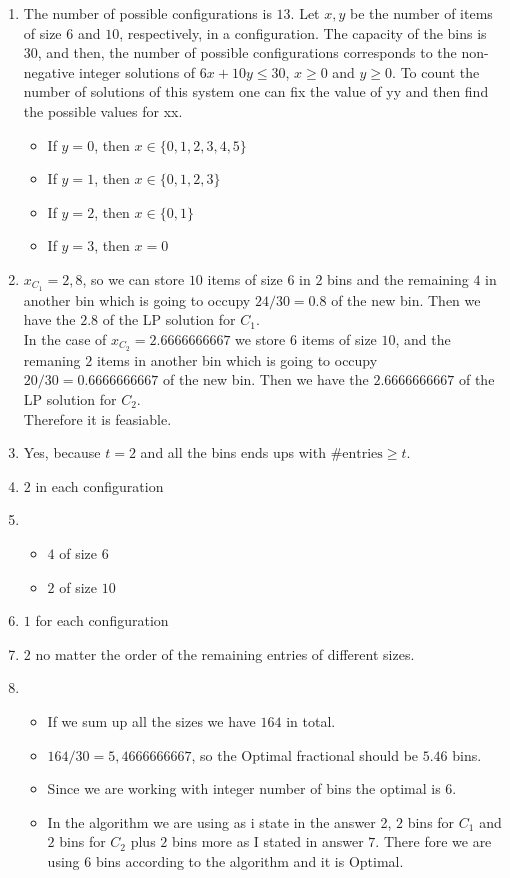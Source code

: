 \documentclass[12pt, a4paper]{article}
\begin{document}
\begin{enumerate}
  \item The number of possible configurations is $13$. Let $x,y$ be the number of items of size $6$ and $10$, respectively, in a configuration. The capacity of the bins is $30$, and then, the number of possible configurations corresponds to the non-negative integer solutions of $6x+10y \leq 30$, $x \geq 0$ and $y \geq 0$. To count the number of solutions of this system one can fix the value of yy and then find the possible values for xx.

  \begin{itemize}
    \item If $y=0$, then $x \in \{0,1,2,3,4,5\}$
    \item If $y=1$, then $x \in \{0,1,2,3\}$
    \item If $y=2$, then $x \in \{0,1\}$
    \item If $y=3$, then $x = 0$
  \end{itemize}

  \item $x_{C_1} = 2,8$, so we can store $10$ items of size $6$ in $2$ bins and the remaining $4$ in another bin which is going to occupy $24/30 = 0.8$ of the new bin. Then we have the $2.8$ of the LP solution for $C_1$.\\
  In the case of $x_{C_2} = 2.6666666667$ we store $6$ items of size $10$, and the remaning $2$ items in another bin which is going to occupy $20/30 = 0.6666666667$ of the new bin. Then we have the $2.6666666667$ of the LP solution for $C_2$.\\
  Therefore it is feasiable.
  \item Yes, because $t = 2$ and all the bins ends ups with $\text{\#entries} \geq t$.
  \item $2$ in each configuration
  \item \begin{itemize}
    \item $4$ of size $6$
    \item $2$ of size $10$
  \end{itemize}
  \item $1$ for each configuration
  \item $2$ no matter the order of the remaining entries of different sizes.
  \item \begin{itemize}
    \item If we sum up all the sizes we have $164$ in total.
    \item $164/30 = 5,4666666667$, so the Optimal fractional should be $5.46$ bins.
    \item Since we are working with integer number of bins the optimal is $6$. 
    \item In the algorithm we are using as i state in the answer 2, $2$ bins for $C_1$ and $2$ bins for $C_2$ plus $2$ bins more as I stated in answer $7$. There fore we are using $6$ bins according to the algorithm and it is Optimal.
  \end{itemize}
  
\end{enumerate}
\end{document}
